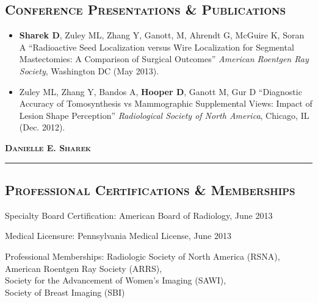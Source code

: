 \documentclass[12pt,letterpaper,oneside]{article}
\newenvironment{indentsection}[1]%
{\begin{list}{}%
	{\setlength{\leftmargin}{#1}}%
	\item[]%
}
{\end{list}}
\begin{document}
\vspace{-0.4em}
\subsection*{\centering\textsc{Conference Presentations \& Publications}}

\begin{itemize}
\parskip=0.1em
\item \textbf{Sharek D}, Zuley ML, Zhang Y, Ganott, M, Ahrendt G, McGuire K, Soran A ``Radioactive Seed Localization versus Wire Localization for Segmental Mastectomies: A Comparison of Surgical 
Outcomes'' \emph{American Roentgen Ray Society}, Washington DC (May 2013). 

\item Zuley ML, Zhang Y, Bandos A, \textbf{Hooper D}, Ganott M, Gur D ``Diagnostic Accuracy of Tomosynthesis vs Mammographic Supplemental Views: Impact of Lesion Shape Perception'' \emph{Radiological Society of North America}, Chicago, IL (Dec. 2012).
\end{itemize}
\pagebreak
\begin{center}
{\LARGE \textbf{\textsc{Danielle E. Sharek}}}
\end{center}
\vspace{-0.4em}
\hrule
\vspace{-0.4em}
\subsection*{\centering\textsc{Professional Certifications \& Memberships}}

\begin{indentsection}{6mm}
\begin{description*}
	\item[Specialty Board Certification:] American Board of Radiology, June 2013
	\vspace{1mm}
	\item[Medical Licensure:]Pennsylvania Medical License, June 2013
	\vspace{1mm}
	\item[Professional Memberships:] Radiologic Society of North America (RSNA), \\
	\phantom{[Professional Memberships:]\xspace}American Roentgen Ray Society (ARRS),\\ 
	\phantom{[Professional Memberships:]\xspace}Society for the Advancement of Women's Imaging (SAWI),\\ 
	\phantom{[Professional Memberships:]\xspace}Society of Breast Imaging (SBI)
\end{description*}
\end{indentsection}
\end{document}
